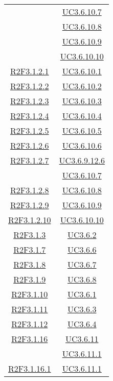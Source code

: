\begin{longtable}{|c|c|}
& \hyperlink{UC3.6.10.7}{UC3.6.10.7}\\
& \hyperlink{UC3.6.10.8}{UC3.6.10.8}\\
& \hyperlink{UC3.6.10.9}{UC3.6.10.9}\\
& \hyperlink{UC3.6.10.10}{UC3.6.10.10}\\
\hline
\hyperlink{R2F3.1.2.1}{R2F3.1.2.1} & \hyperlink{UC3.6.10.1}{UC3.6.10.1}\\
\hline
\hyperlink{R2F3.1.2.2}{R2F3.1.2.2} & \hyperlink{UC3.6.10.2}{UC3.6.10.2}\\
\hline
\hyperlink{R2F3.1.2.3}{R2F3.1.2.3} & \hyperlink{UC3.6.10.3}{UC3.6.10.3}\\
\hline
\hyperlink{R2F3.1.2.4}{R2F3.1.2.4} & \hyperlink{UC3.6.10.4}{UC3.6.10.4}\\
\hline
\hyperlink{R2F3.1.2.5}{R2F3.1.2.5} & \hyperlink{UC3.6.10.5}{UC3.6.10.5}\\
\hline
\hyperlink{R2F3.1.2.6}{R2F3.1.2.6} & \hyperlink{UC3.6.10.6}{UC3.6.10.6}\\
\hline
\hyperlink{R2F3.1.2.7}{R2F3.1.2.7} & \hyperlink{UC3.6.9.12.6}{UC3.6.9.12.6}\\
& \hyperlink{UC3.6.10.7}{UC3.6.10.7}\\
\hline
\hyperlink{R2F3.1.2.8}{R2F3.1.2.8} & \hyperlink{UC3.6.10.8}{UC3.6.10.8}\\
\hline
\hyperlink{R2F3.1.2.9}{R2F3.1.2.9} & \hyperlink{UC3.6.10.9}{UC3.6.10.9}\\
\hline
\hyperlink{R2F3.1.2.10}{R2F3.1.2.10} & \hyperlink{UC3.6.10.10}{UC3.6.10.10}\\
\hline
\hyperlink{R2F3.1.3}{R2F3.1.3} & \hyperlink{UC3.6.2}{UC3.6.2}\\
\hline
\hyperlink{R2F3.1.7}{R2F3.1.7} & \hyperlink{UC3.6.6}{UC3.6.6}\\
\hline
\hyperlink{R2F3.1.8}{R2F3.1.8} & \hyperlink{UC3.6.7}{UC3.6.7}\\
\hline
\hyperlink{R2F3.1.9}{R2F3.1.9} & \hyperlink{UC3.6.8}{UC3.6.8}\\
\hline
\hyperlink{R2F3.1.10}{R2F3.1.10} & \hyperlink{UC3.6.1}{UC3.6.1}\\
\hline
\hyperlink{R2F3.1.11}{R2F3.1.11} & \hyperlink{UC3.6.3}{UC3.6.3}\\
\hline
\hyperlink{R2F3.1.12}{R2F3.1.12} & \hyperlink{UC3.6.4}{UC3.6.4}\\
\hline
\hyperlink{R2F3.1.16}{R2F3.1.16} & \hyperlink{UC3.6.11}{UC3.6.11}\\
& \hyperlink{UC3.6.11.1}{UC3.6.11.1}\\
\hline
\hyperlink{R2F3.1.16.1}{R2F3.1.16.1} & \hyperlink{UC3.6.11.1}{UC3.6.11.1}\\

\end{longtable}
